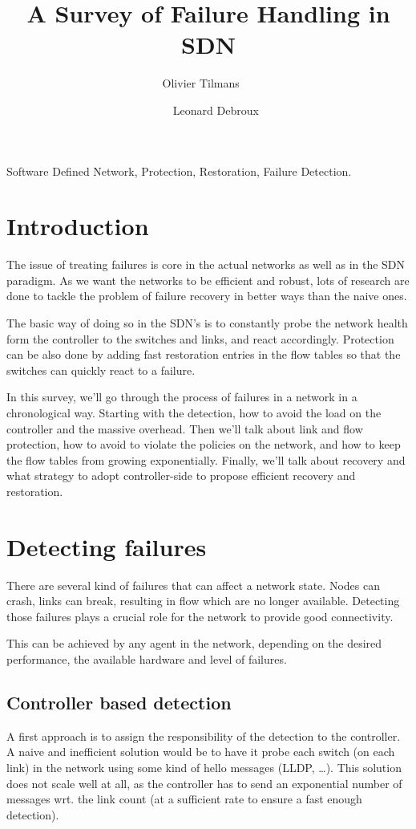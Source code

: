 \documentclass[compsoc]{IEEEtran}
\author{Olivier Tilmans ~~\and~~ Leonard Debroux}
\title{A Survey of Failure Handling in SDN}
\begin{document}
\maketitle
\begin{abstract}

\end{abstract}

\begin{IEEEkeywords}
Software Defined Network, Protection, Restoration, Failure Detection.
\end{IEEEkeywords}

\section{Introduction}
The issue of treating failures is core in the actual networks as well as in the SDN paradigm. As we want the networks to be efficient and robust, lots of research are done to tackle the problem of failure recovery in better ways than the naive ones.

The basic way of doing so in the SDN's is to constantly probe the network health form the controller to the switches and links, and react accordingly. Protection can be also done by adding fast restoration entries in the flow tables so that the switches can quickly react to a failure.

In this survey, we'll go through the process of failures in a network in a chronological way. Starting with the detection, how to avoid the load on the controller and the massive overhead. Then we'll talk about link and flow protection, how to avoid to violate the policies on the network, and how to keep the flow tables from growing exponentially. Finally, we'll talk about recovery and what strategy to adopt controller-side to propose efficient recovery and restoration.

\section{Detecting failures}
There are several kind of failures that can affect a network state. Nodes can crash, links can break, resulting in flow which are no longer available. Detecting those failures plays a crucial role for the network to provide good connectivity.

This can be achieved by any agent in the network, depending on the desired performance, the available hardware and level of failures.

\subsection{Controller based detection}
A first approach is to assign the responsibility of the detection to the controller. A naive and inefficient solution would be to have it probe each switch (on each link) in the network using some kind of hello messages (LLDP, \ldots). This solution does not scale well at all, as the controller has to send an exponential number of messages wrt. the link count (at a sufficient rate to ensure a fast enough detection).
\end{document}
